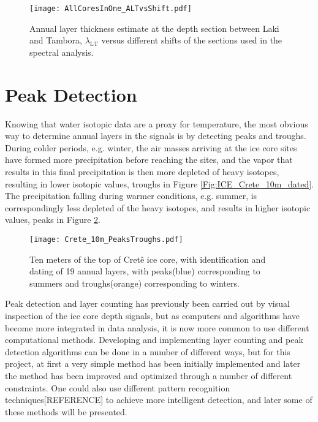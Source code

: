 \documentclass[../../CompleteThesis2/Complete_2ndDraft]{subfiles}
\begin{document}
\begin{figure}[h]
	\centering
	\texttt{[image: AllCoresInOne\_ALTvsShift.pdf]}
	\caption[$\lambda_{\text{LT}}0$ vs. $s_{\text{sec}}$]{\small Annual layer thickness estimate at the depth section between Laki and Tambora, $\lambda_{\text{LT}}$ versus different shifts of the sections used in the spectral analysis.}
	\label{fig:AllCores_ALTvsShift}
\end{figure}




\section[Peak Detection]{Peak Detection}
\label{Sec:CompMeths_PeakDetection}

Knowing that water isotopic data are a proxy for temperature, the most obvious way to determine annual layers in the signals is by detecting peaks and troughs. During colder periods, e.g. winter, the air masses arriving at the ice core sites have formed more precipitation before reaching the sites, and the vapor that results in this final precipitation is then more depleted of heavy isotopes, resulting in lower isotopic values, troughs in Figure \ref{Fig:ICE_Crete_10m_dated}. The precipitation falling during warmer conditions, e.g. summer, is correspondingly less depleted of the heavy isotopes, and results in higher isotopic values, peaks in Figure \ref{Fig:COMPMETH_Crete_10m_PeaksTroughs}.
\begin{figure}[h]
	\centering
	\texttt{[image: Crete\_10m\_PeaksTroughs.pdf]}
	\caption[10 m of Crête core with peaks and troughs.]{\small Ten meters of the top of Cretê ice core, with identification and dating of 19 annual layers, with peaks(blue) corresponding to summers and troughs(orange) corresponding to winters.}
	\label{Fig:COMPMETH_Crete_10m_PeaksTroughs}
\end{figure}

Peak detection and layer counting has previously been carried out by visual inspection of the ice core depth signals, but as computers and algorithms have become more integrated in data analysis, it is now more common to use different computational methods. Developing and implementing layer counting and peak detection algorithms can be done in a number of different ways, but for this project, at first a very simple method has been initially implemented and later the method has been improved and optimized through a number of different constraints. One could also use different pattern recognition techniques[REFERENCE] to achieve more intelligent detection, and later some of these methods will be presented.
\end{document}
